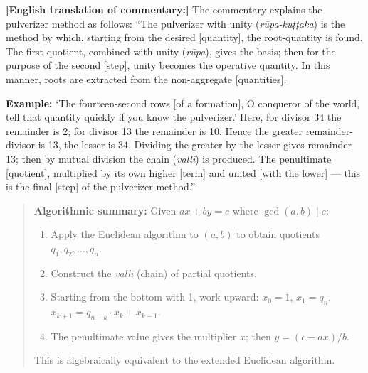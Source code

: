 \documentclass[10pt,a4paper]{article}
\newenvironment{engcommentary}
  {\begin{quote}\small\color{sectioncolor}}
  {\end{quote}}
\begin{document}
\begin{minipage}[t]{0.47\textwidth}
\end{minipage}%
\hfill\vline\hfill%
\begin{minipage}[t]{0.47\textwidth}
\textbf{[English translation of commentary:]}
The commentary explains the pulverizer method as follows: ``The pulverizer
with unity (\textit{rūpa-kuṭṭaka}) is the method by which, starting from the desired [quantity],
the root-quantity is found. The first quotient, combined with unity (\textit{rūpa}),
gives the basis; then for the purpose of the second [step], unity becomes the
operative quantity. In this manner, roots are extracted from the non-aggregate
[quantities].

\textbf{Example:} `The fourteen-second rows [of a formation], O conqueror of the world,
tell that quantity quickly if you know the pulverizer.' Here, for divisor 34 the remainder is 2;
for divisor 13 the remainder is 10. Hence the greater remainder-divisor is 13, the lesser is 34.
Dividing the greater by the lesser gives remainder 13; then by mutual division the chain (\textit{vallī})
is produced. The penultimate [quotient], multiplied by its own higher [term] and united [with
the lower] --- this is the final [step] of the pulverizer method.''
\end{minipage}

\vspace{1.5em}

\begin{engcommentary}
\textbf{Algorithmic summary:} Given $ax + by = c$ where $\gcd(a,b) \mid c$:
\begin{enumerate}
\item Apply the Euclidean algorithm to $(a, b)$ to obtain quotients $q_1, q_2, \dots, q_n$.
\item Construct the \textit{vallī} (chain) of partial quotients.
\item Starting from the bottom with 1, work upward: $x_0 = 1$, $x_1 = q_n$,
$x_{k+1} = q_{n-k} \cdot x_k + x_{k-1}$.
\item The penultimate value gives the multiplier $x$; then $y = (c - ax)/b$.
\end{enumerate}
This is algebraically equivalent to the extended Euclidean algorithm.
\end{engcommentary}
\end{document}
